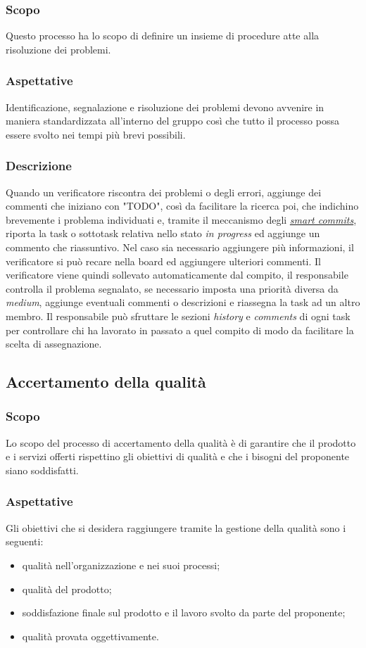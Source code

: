     \subsubsection{Scopo}
        Questo processo ha lo scopo di definire un insieme di procedure atte alla risoluzione dei problemi.
    \subsubsection{Aspettative}
        Identificazione, segnalazione e risoluzione dei problemi devono avvenire in maniera standardizzata all'interno del gruppo così che tutto il processo possa essere svolto nei tempi più brevi possibili.
    \subsubsection{Descrizione}
        Quando un verificatore riscontra dei problemi o degli errori, aggiunge dei commenti che iniziano con "TODO", così da facilitare la ricerca poi, che indichino brevemente i problema individuati e, tramite il meccanismo degli \hyperref[jiraintegration]{\textit{smart commits}}, riporta la task o sottotask relativa nello stato \textit{in progress} ed aggiunge un commento che riassuntivo. Nel caso sia necessario aggiungere più informazioni, il verificatore si può recare nella board ed aggiungere ulteriori commenti. Il verificatore viene quindi sollevato automaticamente dal compito, il responsabile controlla il problema segnalato, se necessario imposta una priorità diversa da \textit{medium}, aggiunge eventuali commenti o descrizioni e riassegna la task ad un altro membro. Il responsabile può sfruttare le sezioni \textit{history} e \textit{comments} di ogni task per controllare chi ha lavorato in passato a quel compito di modo da facilitare la scelta di assegnazione.

\subsection{Accertamento della qualità} 
    \subsubsection{Scopo}
    Lo scopo del processo di accertamento della qualità è di garantire che il prodotto e i servizi offerti rispettino gli obiettivi di qualità e che i bisogni del proponente siano soddisfatti.
    \subsubsection{Aspettative}
    Gli obiettivi che si desidera raggiungere tramite la gestione della qualità sono i seguenti:
    \begin{itemize}
    	\item qualità nell'organizzazione e nei suoi processi;
    	\item qualità del prodotto;
    	\item soddisfazione finale sul prodotto e il lavoro svolto da parte del proponente;
    	\item qualità provata oggettivamente.
    \end{itemize}
